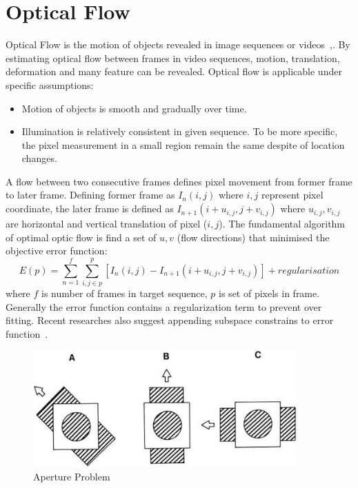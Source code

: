 \section{Optical Flow}
\label{sec:bg_opticalflow}
Optical Flow is the motion of objects revealed in image sequences or videos~\cite{fleet2006optical},\cite{Sun2010}. By estimating optical flow between frames in video sequences, motion, translation, deformation and many feature can be revealed. Optical flow is applicable under specific assumptions:
\begin{itemize}
  \item Motion of objects is smooth and gradually over time.
  \item Illumination is relatively consistent in given sequence. To be more specific, the pixel measurement in a small region remain the same despite of location changes.
\end{itemize}
A flow between two consecutive frames defines pixel movement from former frame to later frame. Defining former frame as \(I_n(i,j)\) where \(i,j\) represent pixel coordinate, the later frame is defined as \(I_{n+1}(i+u_{i,j},j+v_{i,j})\) where \(u_{i,j},v_{i,j}\) are horizontal and vertical translation of pixel (\(i,j\)). The fundamental algorithm of optimal optic flow is find a set of $u, v$ (flow directions) that minimised the objective error function:
\begin{equation}
E(p)=\sum^f_{n=1}\sum^{p}_{i,j\in p}[I_n(i,j)-I_{n+1}(i+u_{i,j},j+v_{i,j})]+regularisation
\end{equation}
where $f$ is number of frames in target sequence, $p$ is set of pixels in frame. Generally the error function contains a regularization term to prevent over fitting. Recent researches also suggest appending subspace constrains to error function~\cite{Garg2013, Garg, Garg2013a}. 

\begin{figure}[ht]
\centering
\includegraphics[width=0.9\textwidth]{resources/Background/aperture_problem}
\caption{Aperture Problem}
\label{fig:aperture_problem}
\end{figure}


